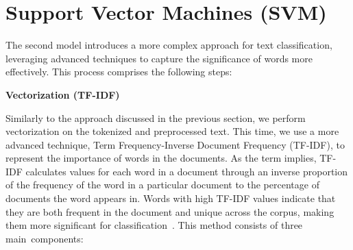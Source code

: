 \vspace{3mm}


\newpage

\section{Support Vector Machines (SVM)}

\noindent The second model introduces a more complex approach for text classification, leveraging advanced techniques to capture the significance of words more effectively. This process comprises the following steps:

\vspace{3mm} 

\textbf{\large Vectorization (TF-IDF)}

\vspace{3mm}

Similarly to the approach discussed in the previous section, we perform vectorization on the tokenized and preprocessed text. This time, we use a more advanced technique, Term Frequency-Inverse Document Frequency (TF-IDF), to represent the importance of words in the documents. As the term implies, TF-IDF calculates values for each word in a document through an inverse proportion of the frequency of the word in a particular document to the percentage of documents the word appears in. Words with high TF-IDF values indicate that they are both frequent in the document and unique across the corpus, making them more significant for classification~\cite{ramos2003using}. This method consists of three main~components: 

